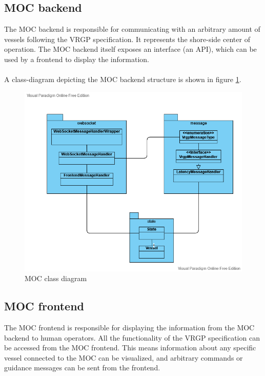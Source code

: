\subsection{MOC backend}

The MOC backend is responsible for communicating with an arbitrary amount of vessels following the VRGP specification. It represents the shore-side center of operation. The MOC backend itself exposes an interface (an API), which can be used by a frontend to display the information.
\\\\
A class-diagram depicting the MOC backend structure is shown in figure \ref{fig:moc-class-diagram}.

\begin{figure}[ht]
	\centering
	\includegraphics[width=\linewidth]{diagrams/ClassDiagramMOC}
	\caption{MOC class diagram}
	\label{fig:moc-class-diagram}
\end{figure}

\subsection{MOC frontend}

The MOC frontend is responsible for displaying the information from the MOC backend to human operators. All the functionality of the VRGP specification can be accessed from the MOC frontend. This means information about any specific vessel connected to the MOC can be visualized, and arbitrary commands or guidance messages can be sent from the frontend.

